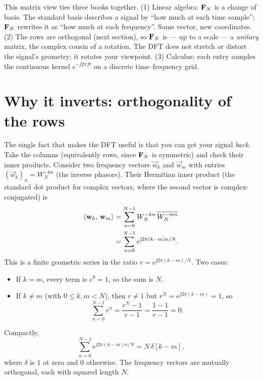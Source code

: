 \begin{connectionbox}
This matrix view ties three books together. (1) Linear algebra: $\mathbf{F}_N$ is a
change of basis. The standard basis describes a signal by ``how much at each time
sample''; $\mathbf{F}_N$ rewrites it as ``how much at each frequency''. Same vector,
new coordinates. (2) The rows are orthogonal (next section), so $\mathbf{F}_N$ is ---
up to a scale --- a \emph{unitary} matrix, the complex cousin of a rotation. The
DFT does not stretch or distort the signal's geometry; it rotates your
viewpoint. (3) Calculus: each entry samples the continuous kernel $e^{-\jj 2\pi f t}$ on a discrete
time--frequency grid.
\end{connectionbox}

\section{Why it inverts: orthogonality of the rows}
\label{ch08:orthogonality}

The single fact that makes the DFT useful is that you can get your signal
\emph{back}. Take the columns (equivalently rows, since $\mathbf{F}_N$ is symmetric)
and check their inner products. Consider two frequency vectors
$\vec{w}_k$ and $\vec{w}_m$ with entries $(\vec{w}_k)_n = W_N^{-kn}$ (the inverse
phasors). Their Hermitian inner product (the standard dot product for complex vectors, where the second vector is complex-conjugated) is
\begin{align*}
\langle \mathbf{w}_k,\, \mathbf{w}_m \rangle &= \sum_{n=0}^{N-1} W_N^{-kn}\, \overline{W_N^{-mn}} \\
&= \sum_{n=0}^{N-1} e^{\mathrm{j} 2\pi (k-m) n / N}.
\end{align*}
This is a finite geometric series in the ratio $r = e^{\jj 2\pi (k-m)/N}$. Two
cases:
\begin{itemize}
\item If $k = m$, every term is $e^0 = 1$, so the sum is $N$.
\item If $k \neq m$ (with $0 \le k,m < N$), then $r \neq 1$ but $r^N =
e^{\jj 2\pi(k-m)} = 1$, so
\[
\sum_{n=0}^{N-1} r^n = \frac{r^N - 1}{r - 1} = \frac{1-1}{r-1} = 0.
\]
\end{itemize}
Compactly,
\[
\sum_{n=0}^{N-1} e^{\jj 2\pi (k-m) n / N} = N\,\delta[k-m],
\]
where $\delta$ is $1$ at zero and $0$ otherwise. The frequency vectors are
mutually orthogonal, each with squared length $N$.

